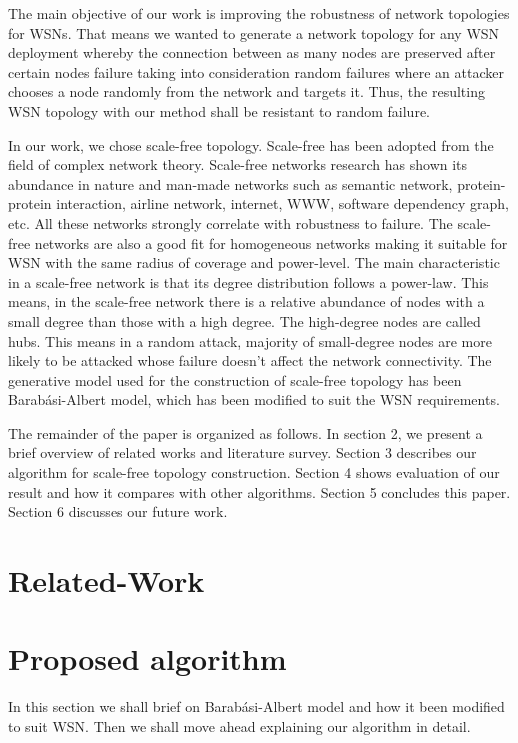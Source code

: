 \documentclass{article}
\begin{document}
	The main objective of our work is improving the robustness of network topologies for WSNs. That means we wanted to generate a network topology for any WSN deployment whereby the connection between as many nodes are preserved after certain nodes failure taking into consideration random failures where an attacker chooses a node randomly from the network and targets it. Thus, the resulting WSN topology with our method shall be resistant to random failure.
	
	In our work, we chose scale-free topology. Scale-free has been adopted from the field of complex network theory. Scale-free networks research has shown its abundance in nature and man-made networks such as semantic network, protein-protein interaction, airline network, internet, WWW, software dependency graph, etc. All these networks strongly correlate with robustness to failure. The scale-free networks are also a good fit for homogeneous networks making it suitable for WSN with the same radius of coverage and power-level. The main characteristic in a scale-free network is that its degree distribution follows a power-law. This means, in the scale-free network there is a relative abundance of nodes with a small degree than those with a high degree. The high-degree nodes are called hubs. This means in a random attack, majority of small-degree nodes are more likely to be attacked whose failure doesn't affect the network connectivity. The generative model used for the construction of scale-free topology has been Barab{\'a}si-Albert model, which has been modified to suit the WSN requirements. 
	
	The remainder of the paper is organized as follows. In section 2, we present a brief overview of related works and literature survey. Section 3 describes our algorithm for scale-free topology construction. Section 4 shows evaluation of our result and how it compares with other algorithms. Section 5 concludes this paper. Section 6 discusses our future work.
	
	\section{Related-Work}
	
	\section{Proposed algorithm}
	In this section we shall brief on Barab{\'a}si-Albert model and how it been modified to suit WSN. Then we shall move ahead explaining our algorithm in detail.
	
\end{document}
